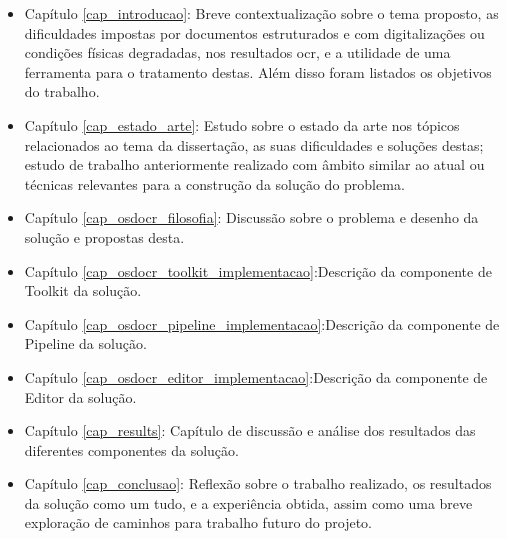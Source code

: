 \begin{itemize}
    \item Capítulo \ref{cap_introducao}: Breve contextualização sobre o tema proposto, as dificuldades impostas por documentos estruturados e com digitalizações ou condições físicas degradadas, nos resultados \acrshort{ocr}, e a utilidade de uma ferramenta para o tratamento destas. Além disso foram listados os objetivos do trabalho.

    \item Capítulo \ref{cap_estado_arte}: Estudo sobre o estado da arte nos tópicos relacionados ao tema da dissertação, as suas dificuldades e soluções destas; estudo de trabalho anteriormente realizado com âmbito similar ao atual ou técnicas relevantes para a construção da solução do problema.
    
    \item Capítulo \ref{cap_osdocr_filosofia}: Discussão sobre o problema e desenho da solução e propostas desta.

    \item Capítulo \ref{cap_osdocr_toolkit_implementacao}:Descrição da componente de Toolkit da solução.
    
    \item Capítulo \ref{cap_osdocr_pipeline_implementacao}:Descrição da componente de Pipeline da solução.
    
    \item Capítulo \ref{cap_osdocr_editor_implementacao}:Descrição da componente de Editor da solução.
    
    \item Capítulo \ref{cap_results}: Capítulo de discussão e análise dos resultados das diferentes componentes da solução.
    
    \item Capítulo \ref{cap_conclusao}: Reflexão sobre o trabalho realizado, os resultados da solução como um tudo, e a experiência obtida, assim como uma breve exploração de caminhos para trabalho futuro do projeto. 
\end{itemize}
